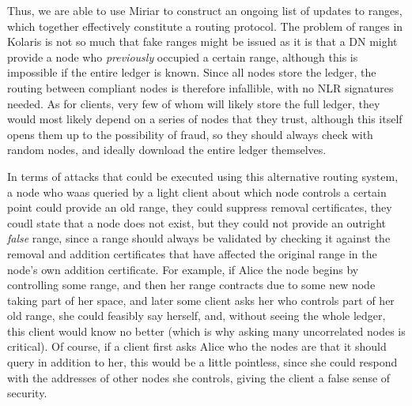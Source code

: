\documentclass{extreport}
\begin{document}
Thus, we are able to use Miriar to construct an ongoing list of updates to ranges, which together effectively constitute a routing protocol. The problem of ranges in Kolaris is not so much that fake ranges might be issued as it is that a DN might provide a node who \emph{previously} occupied a certain range, although this is impossible if the entire ledger is known. Since all nodes store the ledger, the routing between compliant nodes is therefore infallible, with no NLR signatures needed. As for clients, very few of whom will likely store the full ledger, they would most likely depend on a series of nodes that they trust, although this itself opens them up to the possibility of fraud, so they should always check with random nodes, and ideally download the entire ledger themselves.

In terms of attacks that could be executed using this alternative routing system, a node who waas queried by a light client about which node controls a certain point could provide an old range, they could suppress removal certificates, they coudl state that a node does not exist, but they could not provide an outright \emph{false} range, since a range should always be validated by checking it against the removal and addition certificates that have affected the original range in the node's own addition certificate. For example, if Alice the node begins by controlling some range, and then her range contracts due to some new node taking part of her space, and later some client asks her who controls part of her old range, she could feasibly say herself, and, without seeing the whole ledger, this client would know no better (which is why asking many uncorrelated nodes is critical). Of course, if a client first asks Alice who the nodes are that it should query in addition to her, this would be a little pointless, since she could respond with the addresses of other nodes she controls, giving the client a false sense of security.
\end{document}
